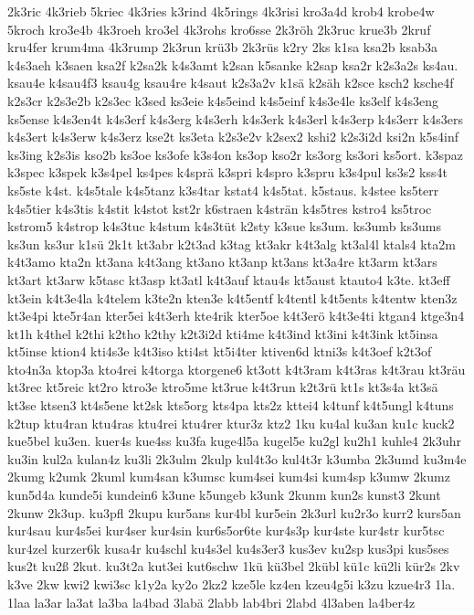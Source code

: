 {2k3ric
4k3rieb
5kriec
4k3ries
k3rind
4k5rings
4k3risi
kro3a4d
krob4
krobe4w
5kroch
kro3e4b
4k3roeh
kro3el
4k3rohs
kro6sse
2k3röh
2k3ruc
krue3b
2kruf
kru4fer
krum4ma
4k3rump
2k3run
krü3b
2k3rüs
k2ry
2ks
k1sa
ksa2b
ksab3a
k4s3aeh
k3saen
ksa2f
k2sa2k
k4s3amt
k2san
k5sanke
k2sap
ksa2r
k2s3a2s
ks4au.
ksau4e
k4sau4f3
ksau4g
ksau4re
k4saut
k2s3a2v
k1sä
k2säh
k2sce
ksch2
ksche4f
k2s3cr
k2s3e2b
k2s3ec
k3sed
ks3eie
k4s5eind
k4s5einf
k4s3e4le
ks3elf
k4s3eng
ks5ense
k4s3en4t
k4s3erf
k4s3erg
k4s3erh
k4s3erk
k4s3erl
k4s3erp
k4s3err
k4s3ers
k4s3ert
k4s3erw
k4s3erz
kse2t
ks3eta
k2s3e2v
k2sex2
kshi2
k2s3i2d
ksi2n
k5s4inf
ks3ing
k2s3is
kso2b
ks3oe
ks3ofe
k3s4on
ks3op
kso2r
ks3org
ks3ori
ks5ort.
k3spaz
k3spec
k3spek
k3s4pel
ks4pes
k4sprä
k3spri
k4spro
k3spru
k3s4pul
ks3s2
kss4t
ks5ste
k4st.
k4s5tale
k4s5tanz
k3s4tar
kstat4
k4s5tat.
k5staus.
k4stee
ks5terr
k4s5tier
k4s3tis
k4stit
k4stot
kst2r
k6straen
k4strän
k4s5tres
kstro4
ks5troc
kstrom5
k4strop
k4s3tuc
k4stum
k4s3tüt
k2sty
k3sue
ks3um.
ks3umb
ks3ums
ks3un
ks3ur
k1sü
2k1t
kt3abr
k2t3ad
k3tag
kt3akr
k4t3alg
kt3al4l
ktals4
kta2m
k4t3amo
kta2n
kt3ana
k4t3ang
kt3ano
kt3anp
kt3ans
kt3a4re
kt3arm
kt3ars
kt3art
kt3arw
k5tasc
kt3asp
kt3atl
k4t3auf
ktau4s
kt5aust
ktauto4
k3te.
kt3eff
kt3ein
k4t3e4la
k4telem
k3te2n
kten3e
k4t5entf
k4tentl
k4t5ents
k4tentw
kten3z
kt3e4pi
kte5r4an
kter5ei
k4t3erh
kte4rik
kter5oe
k4t3erö
k4t3e4ti
ktgan4
ktge3n4
kt1h
k4thel
k2thi
k2tho
k2thy
k2t3i2d
kti4me
k4t3ind
kt3ini
k4t3ink
kt5insa
kt5inse
ktion4
kti4s3e
k4t3iso
kti4st
kt5i4ter
ktiven6d
ktni3s
k4t3oef
k2t3of
kto4n3a
ktop3a
kto4rei
k4torga
ktorgene6
kt3ott
k4t3ram
k4t3ras
k4t3rau
kt3räu
kt3rec
kt5reic
kt2ro
ktro3e
ktro5me
kt3rue
k4t3run
k2t3rü
kt1s
kt3s4a
kt3sä
kt3se
ktsen3
kt4s5ene
kt2sk
kts5org
kts4pa
kts2z
kttei4
k4tunf
k4t5ungl
k4tuns
k2tup
ktu4ran
ktu4ras
ktu4rei
ktu4rer
ktur3z
ktz2
1ku
ku4al
ku3an
ku1c
kuck2
kue5bel
ku3en.
kuer4s
kue4ss
ku3fa
kuge4l5a
kugel5e
ku2gl
ku2h1
kuhle4
2k3uhr
ku3in
kul2a
kulan4z
ku3li
2k3ulm
2kulp
kul4t3o
kul4t3r
k3umba
2k3umd
ku3m4e
2kumg
k2umk
2kuml
kum4san
k3umsc
kum4sei
kum4si
kum4sp
k3umw
2kumz
kun5d4a
kunde5i
kundein6
k3une
k5ungeb
k3unk
2kunm
kun2s
kunst3
2kunt
2kunw
2k3up.
ku3pfl
2kupu
kur5ans
kur4bl
kur5ein
2k3url
ku2r3o
kurr2
kurs5an
kur4sau
kur4s5ei
kur4ser
kur4sin
kur6s5or6te
kur4s3p
kur4ste
kur4str
kur5tsc
kur4zel
kurzer6k
kusa4r
ku4schl
ku4s3el
ku4s3er3
kus3ev
ku2sp
kus3pi
kus5ses
kus2t
ku2ß
2kut.
ku3t2a
kut3ei
kut6schw
1kü
kü3bel
2kübl
kü1c
kü2li
kür2s
2kv
k3ve
2kw
kwi2
kwi3sc
k1y2a
ky2o
2kz2
kze5le
kz4en
kzeu4g5i
k3zu
kzue4r3
1la.
1laa
la3ar
la3at
la3ba
la4bad
3labä
2labb
lab4bri
2labd
4l3aben
la4ber4z
}
